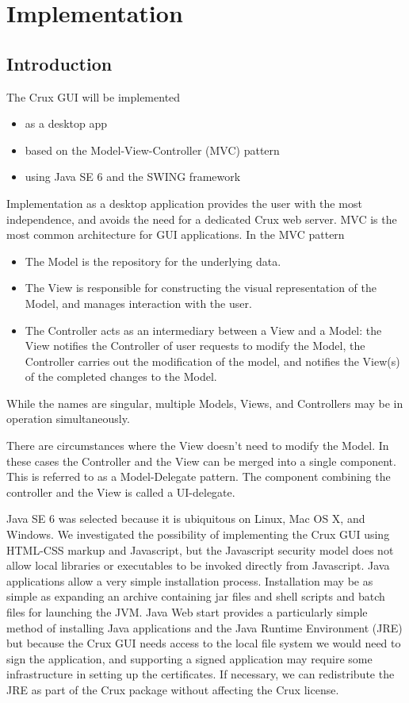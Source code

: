 \documentclass{article}
\begin{document}
\section{Implementation}

\subsection{Introduction}

The Crux GUI will be implemented

\begin{itemize}
\item as a desktop app 
\item based on the Model-View-Controller (MVC) pattern
\item using Java SE 6 and the SWING framework
\end{itemize}

Implementation as a desktop application provides the user with the 
most independence, and avoids the need for a dedicated Crux web server.
MVC is the most common architecture for GUI applications.
In the MVC pattern 
\begin{itemize}
\item The Model is the repository for the underlying data.
\item The View is responsible for constructing the visual representation of the Model,
and manages interaction with the user.
\item The Controller acts as an intermediary between a View and a Model:
the View notifies the Controller of user requests to modify the Model,
the Controller carries out the modification of the model,
and notifies the View(s) of the completed changes to the Model.
\end{itemize}
While the names are singular, multiple Models, Views, and Controllers
may be in operation simultaneously.

There are circumstances where the View doesn't need to modify the Model.
In these cases the Controller and the View can be merged into a single component.
This is referred to as a Model-Delegate pattern. The component combining 
the controller and the View is called a UI-delegate.

Java SE 6 was selected because it is ubiquitous on Linux, Mac OS X, and Windows.
We investigated the possibility of implementing the Crux GUI using HTML-CSS 
markup and Javascript,
but the Javascript security model does not allow local libraries or executables to
be invoked directly from Javascript.
Java applications allow a very simple installation process.
Installation may be as simple as expanding an archive containing 
jar files and shell scripts and batch files for launching the JVM.
Java Web start provides a particularly simple method of installing Java applications
and the Java Runtime Environment (JRE) but because the Crux GUI needs access to the local file
system we would need to sign the application, and supporting a signed application
may require some infrastructure in setting up the certificates.
If necessary, we can redistribute the JRE as part of the Crux package without affecting
the Crux license.
\end{document}
